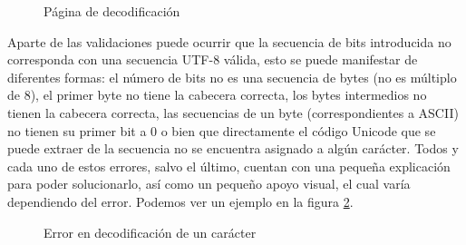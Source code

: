 \documentclass{article}
\begin{document}
\begin{figure}[h!]
  \centering
  \caption{Página de decodificación}
  \label{fig:decodificacion}
\end{figure}

Aparte de las validaciones puede ocurrir que la secuencia de bits introducida no
corresponda con una secuencia UTF-8 válida, esto se puede manifestar de
diferentes formas: el número de bits no es una secuencia de bytes (no es
múltiplo de 8), el primer byte no tiene la cabecera correcta, los bytes
intermedios no tienen la cabecera correcta, las secuencias de un byte
(correspondientes a ASCII) no tienen su primer bit a 0 o bien que directamente
el código Unicode que se puede extraer de la secuencia no se encuentra asignado
a algún carácter. Todos y cada uno de estos errores, salvo el último, cuentan
con una pequeña explicación para poder solucionarlo, así como un pequeño apoyo
visual, el cual varía dependiendo del error. Podemos ver un ejemplo en la
figura \ref{fig:decodificacion-ejemplo-ko}.

\begin{figure}[h!]
  \centering
  \caption{Error en decodificación de un carácter}
  \label{fig:decodificacion-ejemplo-ko}
\end{figure}
\end{document}
